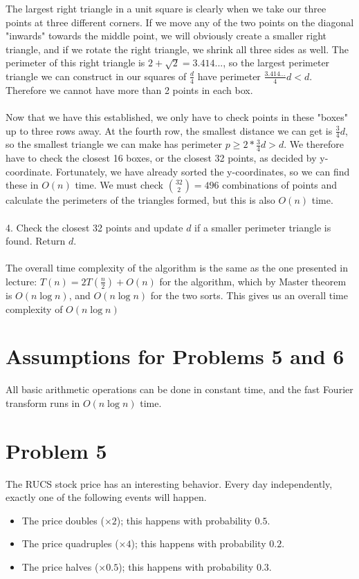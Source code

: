 The largest right triangle in a unit square is clearly when we take our three points at three different corners. If we move any of the two points on the diagonal "inwards" towards the middle point, we will obviously create a smaller right triangle, and if we rotate the right triangle, we shrink all three sides as well. The perimeter of this right triangle is $2+\sqrt{2}=3.414...$, so the largest perimeter triangle we can construct in our squares of $\frac{d}{4}$ have perimeter $\frac{3.414...}{4}d < d$. Therefore we cannot have more than 2 points in each box.
\\ \\ Now that we have this established, we only have to check points in these "boxes" up to three rows away. At the fourth row, the smallest distance we can get is $\frac{3}{4}d$, so the smallest triangle we can make has perimeter $p \ge 2*\frac{3}{4}d > d$. We therefore have to check the closest 16 boxes, or the closest 32 points, as decided by y-coordinate. Fortunately, we have already sorted the y-coordinates, so we can find these in $O(n)$ time. We must check $\binom{32}{2}=496$ combinations of points and calculate the perimeters of the triangles formed, but this is also $O(n)$ time.
\\ \\
4. Check the closest 32 points and update $d$ if a smaller perimeter triangle is found. Return $d$.
\\ \\ The overall time complexity of the algorithm is the same as the one presented in lecture: $T(n)=2T(\frac{n}{2}) + O(n)$ for the algorithm, which by Master theorem is $O(n\log n)$, and $O(n\log n)$ for the two sorts. This gives us an overall time complexity of $O(n\log n)$

\section*{Assumptions for Problems 5 and 6}
All basic arithmetic operations can be done in constant time, and the fast Fourier transform runs in $O(n \log n)$ time.

\section*{Problem 5}
The RUCS stock price has an interesting behavior. Every day independently, exactly one of the following events will happen.
\begin{itemize}
    \item The price doubles ($\times 2$); this happens with probability $0.5$.
    \item The price quadruples ($\times 4$); this happens with probability $0.2$.
    \item The price halves ($\times 0.5$); this happens with probability $0.3$.
\end{itemize}

